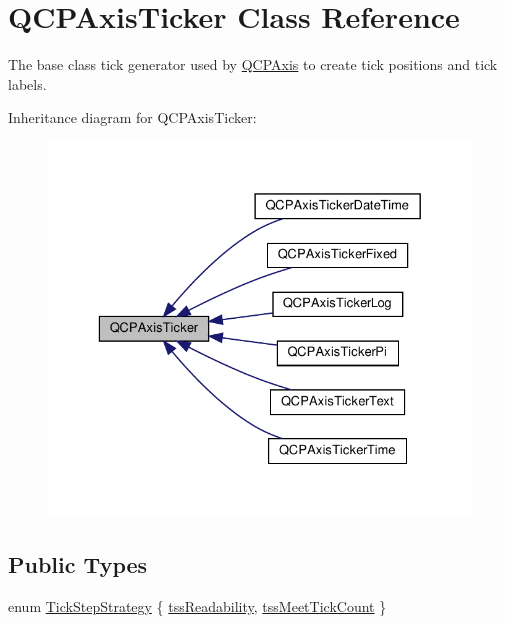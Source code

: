 \hypertarget{classQCPAxisTicker}{}\section{Q\+C\+P\+Axis\+Ticker Class Reference}
\label{classQCPAxisTicker}


The base class tick generator used by \hyperlink{classQCPAxis}{Q\+C\+P\+Axis} to create tick positions and tick labels.  




Inheritance diagram for Q\+C\+P\+Axis\+Ticker\+:\nopagebreak
\begin{figure}[H]
\begin{center}
\leavevmode
\includegraphics[width=329pt]{classQCPAxisTicker__inherit__graph}
\end{center}
\end{figure}
\subsection*{Public Types}
\begin{DoxyCompactItemize}
\item 
enum \hyperlink{classQCPAxisTicker_ab6d2f9d9477821623ac9bc4b21ddf49a}{Tick\+Step\+Strategy} \{ \hyperlink{classQCPAxisTicker_ab6d2f9d9477821623ac9bc4b21ddf49aa9002aa2fd5633ab5556c71a26fed63a8}{tss\+Readability}, 
\hyperlink{classQCPAxisTicker_ab6d2f9d9477821623ac9bc4b21ddf49aa770312b6b9b0c64a37ceeba96e0cd7f2}{tss\+Meet\+Tick\+Count}
 \}
\end{DoxyCompactItemize}
